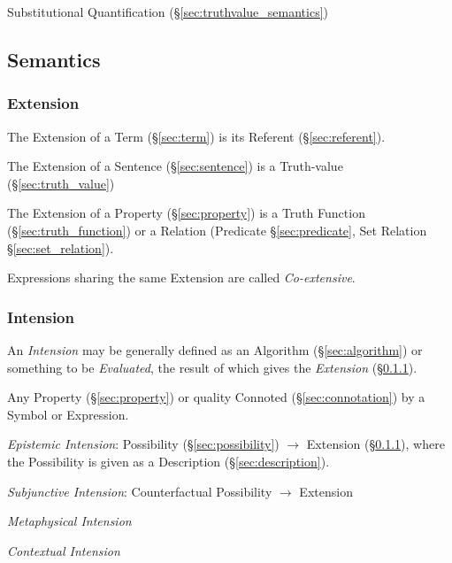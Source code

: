 Substitutional Quantification (\S\ref{sec:truthvalue_semantics})



\subsection{Semantics}\label{sec:semantics}

\subsubsection{Extension}\label{sec:extension}\cite{chalmers02}

The Extension of a Term (\S\ref{sec:term}) is its Referent
(\S\ref{sec:referent}).

The Extension of a Sentence (\S\ref{sec:sentence}) is a Truth-value
(\S\ref{sec:truth_value})

The Extension of a Property (\S\ref{sec:property}) is a Truth Function
(\S\ref{sec:truth_function}) or a Relation (Predicate
\S\ref{sec:predicate}, Set Relation \S\ref{sec:set_relation}).

Expressions sharing the same Extension are called \emph{Co-extensive}.



\subsubsection{Intension}\label{sec:intension}\cite{chalmers02}

An \emph{Intension} may be generally defined as an Algorithm
(\S\ref{sec:algorithm}) or something to be \emph{Evaluated}, the result of which
gives the \emph{Extension} (\S\ref{sec:extension}).

Any Property (\S\ref{sec:property}) or quality Connoted
(\S\ref{sec:connotation}) by a Symbol or Expression.

\emph{Epistemic Intension}: Possibility (\S\ref{sec:possibility}) $\rightarrow$
Extension (\S\ref{sec:extension}), where the Possibility is given as a
Description (\S\ref{sec:description}).

\emph{Subjunctive Intension}: Counterfactual Possibility $\rightarrow$ Extension

\emph{Metaphysical Intension} %

\emph{Contextual Intension}

